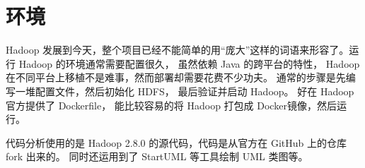 \section{环境}
\label{sec:environment}

Hadoop 发展到今天，整个项目已经不能简单的用“庞大”这样的词语来形容了。运行 Hadoop 的环境通常需要配置很久，
虽然依赖 Java 的跨平台的特性， Hadoop 在不同平台上移植不是难事，然而部署却需要花费不少功夫。
通常的步骤是先编写一堆配置文件，然后初始化 HDFS， 最后验证并启动 Hadoop。
好在 Hadoop 官方提供了 Dockerfile， 能比较容易的将 Hadoop 打包成 Docker镜像，然后运行。

代码分析使用的是 Hadoop 2.8.0 的源代码，代码是从官方在 GitHub 上的仓库 fork 出来的。
同时还运用到了 StartUML 等工具绘制 UML 类图等。

\endinput